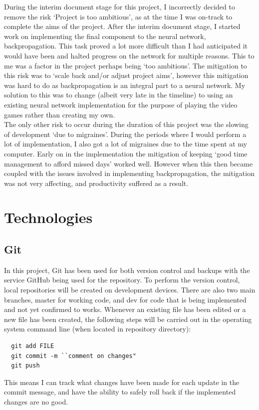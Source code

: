 \documentclass[10pt]{article}
\begin{document}
	During the interim document stage for this project, I incorrectly decided to remove the risk `Project is too ambitious', as at the time I was on-track to complete the aims of the project. After the interim document stage, I started work on implementing the final component to the neural network, backpropagation. This task proved a lot more difficult than I had anticipated it would have been and halted progress on the network for multiple reasons. This to me was a factor in the project perhaps being `too ambitious'. The mitigation to this risk was to `scale back and/or adjust project aims', however this mitigation was hard to do as backpropagation is an integral part to a neural network. My solution to this was to change (albeit very late in the timeline) to using an existing neural network implementation for the purpose of playing the video games rather than creating my own.\\
	
	The only other risk to occur during the duration of this project was the slowing of development `due to migraines'. During the periods where I would perform a lot of implementation, I also got a lot of migraines due to the time spent at my computer. Early on in the implementation the mitigation of keeping `good time management to afford missed days' worked well. However when this then became coupled with the issues involved in implementing backpropagation, the mitigation was not very affecting, and productivity suffered as a result.
	
	\bigskip
\section{Technologies}
	
	\subsection{Git}
		In this project, Git has been used for both version control and backups with the service GitHub being used for the repository. To perform the version control, local repositories will be created on development devices. There are also two main branches, master for working code, and dev for code that is being implemented and not yet confirmed to works. Whenever an existing file has been edited or a new file has been created, the following steps will be carried out in the operating system command line (when located in repository directory):
		\begin{lstlisting}
  git add FILE
  git commit -m ``comment on changes"
  git push
		\end{lstlisting}
		This means I can track what changes have been made for each update in the commit message, and have the ability to safely roll back if the implemented changes are no good.
		
\end{document}

